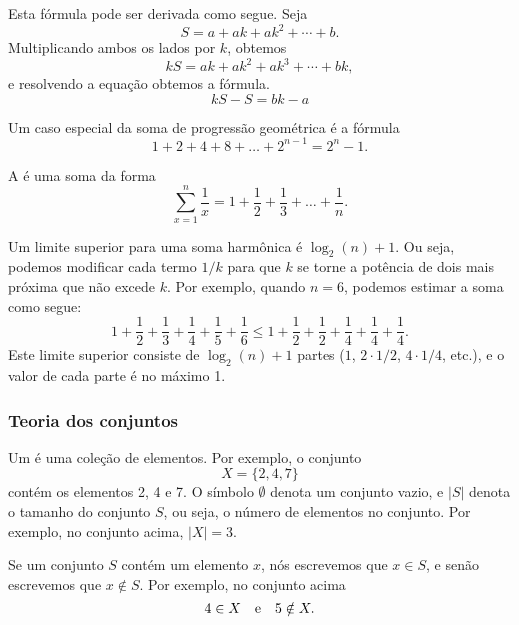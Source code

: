 Esta fórmula pode ser derivada como segue. Seja
\[ S = a + ak + ak^2 + \cdots + b .\]
Multiplicando ambos os lados por $k$, obtemos
\[ kS = ak + ak^2 + ak^3 + \cdots + bk,\]
e resolvendo a equação obtemos a fórmula.
\[ kS-S = bk-a\]

Um caso especial da soma de progressão geométrica é a fórmula
\[1+2+4+8+\ldots+2^{n-1}=2^n-1.\]


A  é uma soma da forma
\[ \sum_{x=1}^n \frac{1}{x} = 1+\frac{1}{2}+\frac{1}{3}+\ldots+\frac{1}{n}.\]

Um limite superior para uma soma harmônica é $\log_2(n)+1$.
Ou seja, podemos modificar cada termo $1/k$ para que $k$ se torne
a potência de dois mais próxima que não excede $k$.
Por exemplo, quando $n=6$, podemos estimar a soma como segue:
\[ 1+\frac{1}{2}+\frac{1}{3}+\frac{1}{4}+\frac{1}{5}+\frac{1}{6} \le
1+\frac{1}{2}+\frac{1}{2}+\frac{1}{4}+\frac{1}{4}+\frac{1}{4}.\]
Este limite superior consiste de $\log_2(n)+1$ partes
($1$, $2 \cdot 1/2$, $4 \cdot 1/4$, etc.),
e o valor de cada parte é no máximo 1.

\subsubsection{Teoria dos conjuntos}


Um  é uma coleção de elementos.
Por exemplo, o conjunto
\[X=\{2,4,7\}\]
contém os elementos 2, 4 e 7.
O símbolo $\emptyset$ denota um conjunto vazio,
e $|S|$ denota o tamanho do conjunto $S$,
ou seja, o número de elementos no conjunto.
Por exemplo, no conjunto acima, $|X|=3$.

Se um conjunto $S$ contém um elemento $x$,
nós escrevemos que $x \in S$,
e senão escrevemos que $x \notin S$.
Por exemplo, no conjunto acima
\[4 \in X \hspace{10px}\textrm{e}\hspace{10px} 5 \notin X.\]

